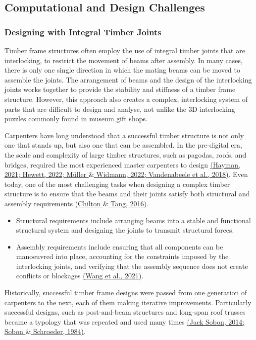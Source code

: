 \documentclass[11pt]{book}
\begin{document}
\subsection{Computational and Design Challenges}

\subsubsection{Designing with Integral Timber Joints}

Timber frame structures often employ the use of integral timber joints that are interlocking, to restrict the movement of beams after assembly. In many cases, there is only one single direction in which the mating beams can be moved to assemble the joints. The arrangement of beams and the design of the interlocking joints works together to provide the stability and stiffness of a timber frame structure. However, this approach also creates a complex, interlocking system of parts that are difficult to design and analyse, not unlike the 3D interlocking puzzles commonly found in museum gift shops.

Carpenters have long understood that a successful timber structure is not only one that stands up, but also one that can be assembled. In the pre-digital era, the scale and complexity of large timber structures, such as pagodas, roofs, and bridges, required the most experienced master carpenters to design \href{https://www.zotero.org/google-docs/?FJwvT8}{(Hayman, 2021; Hewett, 2022; Müller $\&$ Widmann, 2022; Vandenabeele et al., 2018)}. Even today, one of the most challenging tasks when designing a complex timber structure is to ensure that the beams and their joints satisfy both structural and assembly requirements \href{https://www.zotero.org/google-docs/?cy6tn2}{(Chilton $\&$ Tang, 2016)}. 

\begin{itemize}
	\item Structural requirements include arranging beams into a stable and functional structural system and designing the joints to transmit structural forces. 

	\item Assembly requirements include ensuring that all components can be manoeuvred into place, accounting for the constraints imposed by the interlocking joints, and verifying that the assembly sequence does not create conflicts or blockages \href{https://www.zotero.org/google-docs/?81R5f7}{(Wang et al., 2021)}. 

\end{itemize}
Historically, successful timber frame designs were passed from one generation of carpenters to the next, each of them making iterative improvements. Particularly successful designs, such as post-and-beam structures and long-span roof trusses became a typology that was repeated and used many times \href{https://www.zotero.org/google-docs/?u1rNPf}{(Jack Sobon, 2014; Sobon $\&$ Schroeder, 1984)}.
\end{document}
